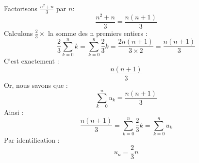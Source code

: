 \documentclass{article}
\date{\today}
\begin{document}
	Factorisons $\frac{n^2+n}{3}$ par $n$:
	\[\frac{n^2+n}{3}=\frac{n(n+1)}{3}\]
	Calculons $\frac{2}{3}\times$ la somme des n premiers entiers :
	\[
		\frac{2}{3}\displaystyle\sum^n_{k=0}k=\displaystyle\sum^n_{k=0}\frac{2}{3}k=\frac{2n(n+1)}{3\times 2}=\frac{n(n+1)}{3}
	\]
	C'est exactement :
	\[\frac{n(n+1)}{3}\]
	Or, nous savons que :
	\[\displaystyle\sum^n_{k=0}u_k=\frac{n(n+1)}{3}\]
	Ainsi :
	\[\frac{n(n+1)}{3}=\displaystyle\sum^n_{k=0}\frac{2}{3}k=\displaystyle\sum^n_{k=0}u_k\]
	Par identification :
	\[u_n = \frac{2}{3}n\]
\end{document}
